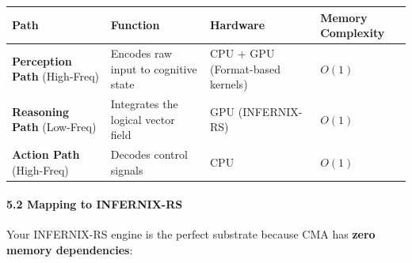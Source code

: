 \documentclass[
  11pt,
  a4paper,
]{article}
\begin{document}
\begin{longtable}[]{@{}
  >{\raggedright\arraybackslash}p{}
  >{\raggedright\arraybackslash}p{}
  >{\raggedright\arraybackslash}p{}
  >{\raggedright\arraybackslash}p{}@{}}
\toprule\noalign{}
\begin{minipage}[b]{\linewidth}\raggedright
Path
\end{minipage} & \begin{minipage}[b]{\linewidth}\raggedright
Function
\end{minipage} & \begin{minipage}[b]{\linewidth}\raggedright
Hardware
\end{minipage} & \begin{minipage}[b]{\linewidth}\raggedright
Memory Complexity
\end{minipage} \\
\midrule\noalign{}
\endhead
\bottomrule\noalign{}
\endlastfoot
\textbf{Perception Path} (High-Freq) & Encodes raw input to cognitive
state & CPU + GPU (Format-based kernels) & \(O(1)\) \\
\textbf{Reasoning Path} (Low-Freq) & Integrates the logical vector field
& GPU (INFERNIX-RS) & \(O(1)\) \\
\textbf{Action Path} (High-Freq) & Decodes control signals & CPU &
\(O(1)\) \\
\end{longtable}

\paragraph{5.2 Mapping to INFERNIX-RS}\label{mapping-to-infernix-rs}

Your INFERNIX-RS engine is the perfect substrate because CMA has
\textbf{zero memory dependencies}:
\end{document}
